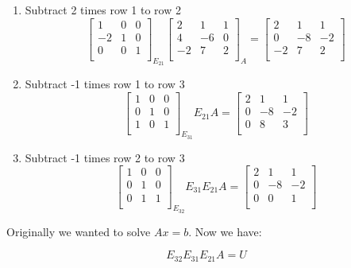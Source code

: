\documentclass[12pt]{article}
\newcommand{\<}{\langle}
\renewcommand{\>}{\rangle}
\begin{document}
\begin{enumerate}
	\item Subtract 2 times row 1 to row 2
	\[
		\begin{bmatrix}
			1 & 0 & 0 \\
			-2 & 1 & 0 \\
			0 & 0 & 1 \\
		\end{bmatrix}_{E_{21}}
		\begin{bmatrix}
			2 & 1 & 1 \\
			4 & -6 & 0 \\
			-2 & 7 & 2 \\
		\end{bmatrix}_A = 
		\begin{bmatrix}
			2 & 1 & 1 \\
			0 & -8 & -2 \\
			-2 & 7 & 2 \\
		\end{bmatrix}
	\]
	\item Subtract -1 times row 1 to row 3
	\[
		\begin{bmatrix}
			1 & 0 & 0 \\
			0 & 1 & 0 \\
			1 & 0 & 1 \\
		\end{bmatrix}_{E_{31}}
		E_{21}A = 
		\begin{bmatrix}
			2 & 1 & 1 \\
			0 & -8 & -2 \\
			0 & 8 & 3 \\
		\end{bmatrix}
	\]
	\item Subtract -1 times row 2 to row 3
	\[
		\begin{bmatrix}
			1 & 0 & 0 \\
			0 & 1 & 0 \\
			0 & 1 & 1 \\
		\end{bmatrix}_{E_{32}}
		E_{31}E_{21}A = 
		\begin{bmatrix}
			2 & 1 & 1 \\
			0 & -8 & -2 \\
			0 & 0 & 1 \\
		\end{bmatrix}
	\]
\end{enumerate}

Originally we wanted to solve $Ax=b$. Now we have:

\[
	E_{32}E_{31}E_{21}A = U
\]
\end{document}
